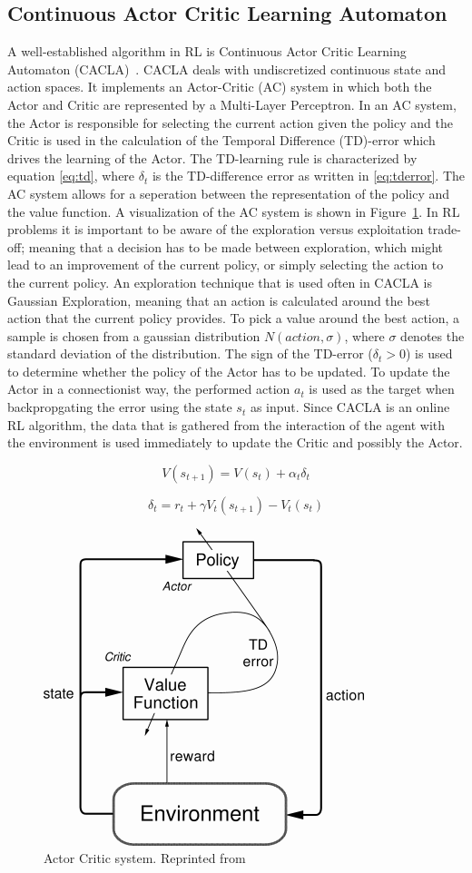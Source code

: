 
\subsection{Continuous Actor Critic Learning Automaton}
A well-established algorithm in RL is Continuous Actor Critic Learning Automaton (CACLA)~\cite{van2007reinforcement}. CACLA deals with undiscretized continuous state and action spaces. It implements an Actor-Critic (AC) system in which both the Actor and Critic are represented by a Multi-Layer Perceptron. In an AC system, the Actor is responsible for selecting the current action given the policy and the Critic is used in the calculation of the Temporal Difference (TD)-error which drives the learning of the Actor. The TD-learning rule is characterized by equation \eqref{eq:td}, where $\delta_{t}$ is the TD-difference error as written in \eqref{eq:tderror}. The AC system allows for a seperation between the representation of the policy and the value function. A visualization of the AC system is shown in Figure~\ref{fig:actorcriticsystem}. In RL problems it is important to be aware of the exploration versus exploitation trade-off; meaning that a decision has to be made between exploration, which might lead to an improvement of the current policy, or simply selecting the action to the current policy. An exploration technique that is used often in CACLA is Gaussian Exploration, meaning that an action is calculated around the best action that the current policy provides. To pick a value around the best action, a sample is chosen from a gaussian distribution $N(action, \sigma)$, where $\sigma$ denotes the standard deviation of the distribution. The sign of the TD-error ($\delta_{t} > 0$) is used to determine whether the policy of the Actor has to be updated. To update the Actor in a connectionist way, the performed action $a_{t}$ is used as the target when backpropgating the error using the state $s_{t}$ as input. Since CACLA is an online RL algorithm, the data that is gathered from the interaction of the agent with the environment is used immediately to update the Critic and possibly the Actor. 

\begin{equation}
\label{eq:td}
V(s_{t+1}) = V(s_t) + \alpha_{t} \delta_{t}
\end{equation}

\begin{equation}
\label{eq:tderror}
\delta_{t} = r_{t} + \gamma V_{t}(s_{t+1}) - V_{t}(s_{t})
\end{equation}

\begin{figure}[t]
 \centering 
    \includegraphics[width = 0.35\columnwidth]{figs/actorcritic.png}
 \caption{Actor Critic system. Reprinted from~\cite{sutton1998reinforcement}}
\label{fig:actorcriticsystem}
\end{figure}



